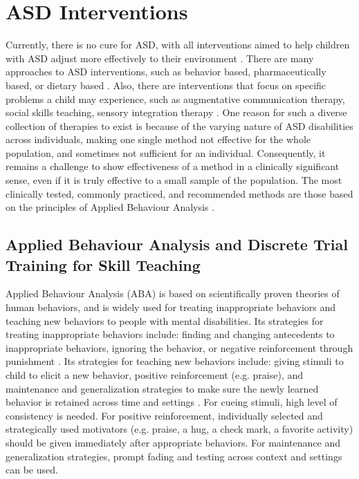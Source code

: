 \section{ASD Interventions}

Currently, there is no cure for ASD, with all interventions aimed to help children with ASD adjust more effectively to their environment \cite{francis2005autism}.  There are many approaches to ASD interventions, such as behavior based, pharmaceutically based, or dietary based \cite{francis2005autism}.  Also, there are interventions that focus on specific problems a child may experience, such as augmentative communication therapy, social skills teaching, sensory integration therapy \cite{francis2005autism}.  One reason for such a diverse collection of therapies to exist is because of the varying nature of ASD disabilities across individuals, making one single method not effective for the whole population, and sometimes not sufficient for an individual.  Consequently, it remains a challenge to show effectiveness of a method in a clinically significant sense, even if it is truly effective to a small sample of the population.  The most clinically tested, commonly practiced, and recommended methods are those based on the principles of Applied Behaviour Analysis \cite{foxx2008applied}.


\subsection{Applied Behaviour Analysis and Discrete Trial Training for Skill Teaching}
Applied Behaviour Analysis (ABA) is based on scientifically proven theories of human behaviors, and is widely used for treating inappropriate behaviors and teaching new behaviors to people with mental disabilities.  Its strategies for treating inappropriate behaviors include: finding and changing antecedents to inappropriate behaviors, ignoring the behavior, or negative reinforcement through punishment \cite{foxx1982decreasing}.  Its strategies for teaching new behaviors include: giving stimuli to child to elicit a new behavior, positive reinforcement (e.g. praise), and maintenance and generalization strategies to make sure the newly learned behavior is retained across time and settings \cite{foxx1982decreasing}.  For cueing stimuli, high level of consistency is needed.  For positive reinforcement, individually selected and strategically used motivators (e.g. praise, a hug, a check mark, a favorite activity) should be given immediately after appropriate behaviors.  For maintenance and generalization strategies, prompt fading and testing across context and settings can be used.


